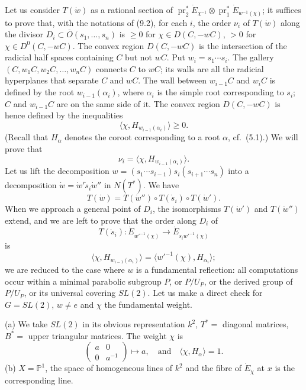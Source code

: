 \documentclass[11pt]{amsart}
\theoremstyle{plain}
\theoremstyle{remark}
\DeclareMathOperator{\pr}{pr}
\begin{document}
Let us consider $T(\dot{w})$ as a rational section of $\pr_2^* \dot{E}_{\chi^{-1}} \otimes \pr_1^* \dot{E}_{w^{-1}(\chi)}$; it suffices to prove that, with the notations of (9.2), for each $i$, the order $\nu_i$ of $T(\dot{w})$ along the divisor $D_i \subset \overline{O}(s_1, \dots, s_n)$ is $\ge 0$ for $\chi \in D(C, -wC)$, $> 0$ for $\chi \in D^0(C, -wC)$. The convex region $D(C, -wC)$ is the intersection of the radicial half spaces containing $C$ but not $wC$. Put $w_i = s_1 \cdots s_i$. The gallery $(C, w_1C, w_2C, \dots, w_nC)$ connects $C$ to $wC$; its walls are all the radicial hyperplanes that separate $C$ and $wC$. The wall between $w_{i-1}C$ and $w_iC$ is defined by the root $w_{i-1}(\alpha_i)$, where $\alpha_i$ is the simple root corresponding to $s_i$; $C$ and $w_{i-1}C$ are on the same side of it. The convex region $D(C, -wC)$ is hence defined by the inequalities
\[
\langle \chi, H_{w_{i-1}(\alpha_i)} \rangle \ge 0.
\]
(Recall that $H_\alpha$ denotes the coroot corresponding to a root $\alpha$, cf.\ (5.1).) We will prove that
\begin{equation}\label{eq:9.5.1}
\nu_i = \langle \chi, H_{w_{i-1}(\alpha_i)} \rangle.
\end{equation}
Let us lift the decomposition $w = (s_1 \cdots s_{i-1}) s_i (s_{i+1} \cdots s_n)$ into a decomposition $\dot{w} = \dot{w}' \dot{s}_i \dot{w}''$ in $N(T^*)$. We have
\[
T(\dot{w}) = T(\dot{w}'') \circ T(\dot{s}_i) \circ T(\dot{w}').
\]
When we approach a general point of $D_i$, the isomorphisms $T(\dot{w}')$ and $T(\dot{w}'')$ extend, and we are left to prove that the order along $D_i$ of
\[
T(\dot{s}_i): \dot{E}_{w'^{-1}(\chi)} \longrightarrow \dot{E}_{s_i w'^{-1}(\chi)}
\]
is
\[
\langle \chi, H_{w_{i-1}(\alpha_i)} \rangle = \langle w'^{-1}(\chi), H_{\alpha_i} \rangle;
\]
we are reduced to the case where $w$ is a fundamental reflection: all computations occur within a minimal parabolic subgroup $P$, or $P/U_P$, or the derived group of $P/U_P$, or its universal covering $SL(2)$. Let us make a direct check for $G = SL(2)$, $w \neq e$ and $\chi$ the fundamental weight.

(a) We take $SL(2)$ in its obvious representation $k^2$, $T^* =$ diagonal matrices, $B^* =$ upper triangular matrices. The weight $\chi$ is
\[
\begin{pmatrix} a & 0 \\ 0 & a^{-1} \end{pmatrix} \mapsto a, \quad \text{and} \quad \langle \chi, H_\alpha \rangle = 1.
\]
(b) $X = \mathbb{P}^1$, the space of homogeneous lines of $k^2$ and the fibre of $\dot{E}_\chi$ at $x$ is the corresponding line.
\end{document}
